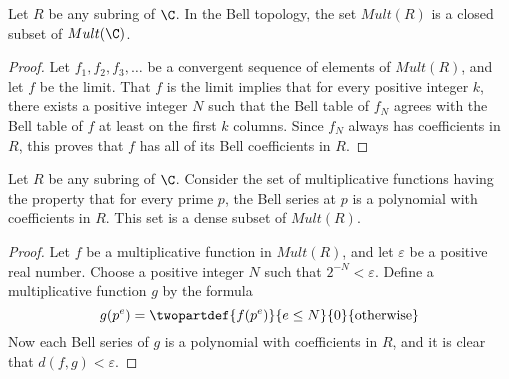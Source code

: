 \documentclass[a4paper]{article}
\begin{document}



\begin{proposition}
Let $R$ be any subring of $\C$. In the Bell topology, the set $Mult(R)$ is a closed subset of $Mult(\C)$.
\end{proposition}
\begin{proof}
Let $f_1, f_2, f_3, \ldots$ be a convergent sequence of elements of $Mult(R)$, and let $f$ be the limit. That $f$ is the limit implies that for every positive integer $k$, there exists a positive integer $N$ such that the Bell table of $f_N$ agrees with the Bell table of $f$ at least on the first $k$ columns. Since $f_N$ always has coefficients in $R$, this proves that $f$ has all of its Bell coefficients in $R$. 
\end{proof}


\begin{proposition}
Let $R$ be any subring of $\C$. Consider the set of multiplicative functions having the property that for every prime $p$, the Bell series at $p$ is a polynomial with coefficients in $R$. This set is a dense subset of $Mult(R)$. 
\end{proposition}


\begin{proof}
Let $f$ be a multiplicative function in $Mult(R)$, and let $\varepsilon$ be a positive real number. Choose a positive integer $N$ such that $2^{-N} < \varepsilon$. Define a multiplicative function $g$ by the formula
$$ g(p^e) = \twopartdef { f(p^e) } {e  \leq N  } {0} {\textrm{otherwise}}$$
Now each Bell series of $g$ is a polynomial with coefficients in $R$, and it is clear that $d(f, g) < \varepsilon$.
\end{proof}
\end{document}
